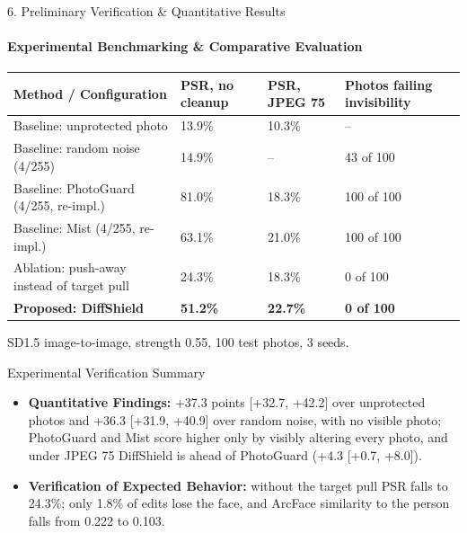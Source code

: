 \documentclass[aspectratio=169, 11pt]{beamer}
\begin{document}
\begin{frame}{6. Preliminary Verification \& Quantitative Results}
    \framesubtitle{Experimental Benchmarking \& Comparative Evaluation}
    \begin{table}
        \centering
        \scriptsize
        \renewcommand{\arraystretch}{1.15}
        \begin{tabular}{L{5.4cm} C{2.2cm} C{2.2cm} C{2.6cm}}
            \toprule
            \textbf{Method / Configuration} & \textbf{PSR, no cleanup} & \textbf{PSR, JPEG 75} & \textbf{Photos failing invisibility} \\
            \midrule
            Baseline: unprotected photo & 13.9\% & 10.3\% & -- \\
            Baseline: random noise (4/255) & 14.9\% & -- & 43 of 100 \\
            Baseline: PhotoGuard (4/255, re-impl.) & 81.0\% & 18.3\% & 100 of 100 \\
            Baseline: Mist (4/255, re-impl.) & 63.1\% & 21.0\% & 100 of 100 \\
            Ablation: push-away instead of target pull & 24.3\% & 18.3\% & 0 of 100 \\
            \textbf{Proposed: DiffShield} & \textbf{51.2\%} & \textbf{22.7\%} & \textbf{0 of 100} \\
            \bottomrule
        \end{tabular}
    \end{table}
    {\tiny SD1.5 image-to-image, strength 0.55, 100 test photos, 3 seeds.}

    \begin{block}{Experimental Verification Summary}
        \scriptsize
        \begin{itemize}
            \item \textbf{Quantitative Findings:} +37.3 points [+32.7, +42.2] over unprotected photos and +36.3 [+31.9, +40.9] over random noise, with no visible photo; PhotoGuard and Mist score higher only by visibly altering every photo, and under JPEG 75 DiffShield is ahead of PhotoGuard (+4.3 [+0.7, +8.0]).
            \item \textbf{Verification of Expected Behavior:} without the target pull PSR falls to 24.3\%; only 1.8\% of edits lose the face, and ArcFace similarity to the person falls from 0.222 to 0.103.
        \end{itemize}
    \end{block}
\end{frame}
\end{document}
